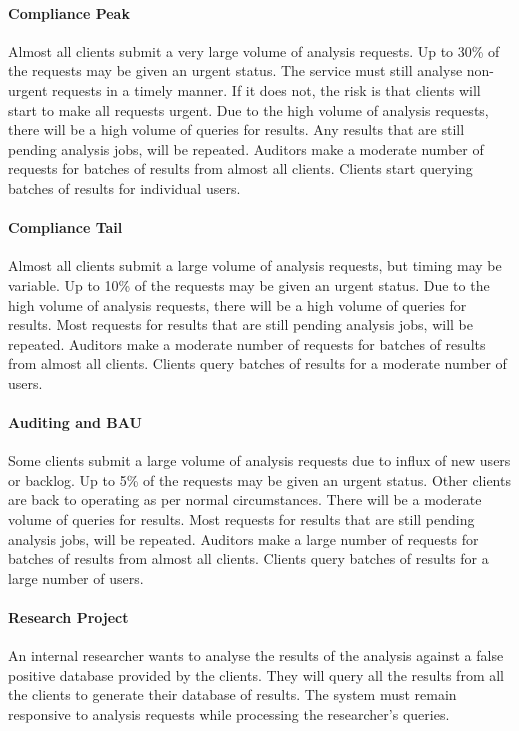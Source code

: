 \documentclass{csse4400}
\begin{document}
\paragraph{Compliance Peak}
Almost all clients submit a very large volume of analysis requests.
Up to 30\% of the requests may be given an urgent status.
The service must still analyse non-urgent requests in a timely manner.
If it does not, the risk is that clients will start to make all requests urgent.
Due to the high volume of analysis requests, there will be a high volume of queries for results.
Any results that are still pending analysis jobs, will be repeated.
Auditors make a moderate number of requests for batches of results from almost all clients.
Clients start querying batches of results for individual users.

\paragraph{Compliance Tail}
Almost all clients submit a large volume of analysis requests, but timing may be variable.
Up to 10\% of the requests may be given an urgent status.
Due to the high volume of analysis requests, there will be a high volume of queries for results.
Most requests for results that are still pending analysis jobs, will be repeated.
Auditors make a moderate number of requests for batches of results from almost all clients.
Clients query batches of results for a moderate number of users.

\paragraph{Auditing and BAU}
Some clients submit a large volume of analysis requests due to influx of new users or backlog.
Up to 5\% of the requests may be given an urgent status.
Other clients are back to operating as per normal circumstances.
There will be a moderate volume of queries for results.
Most requests for results that are still pending analysis jobs, will be repeated.
Auditors make a large number of requests for batches of results from almost all clients.
Clients query batches of results for a large number of users.

\paragraph{Research Project}
An internal researcher wants to analyse the results of the analysis against a false positive database provided by the clients.
They will query all the results from all the clients to generate their database of results.
The system must remain responsive to analysis requests while processing the researcher's queries.
\end{document}
